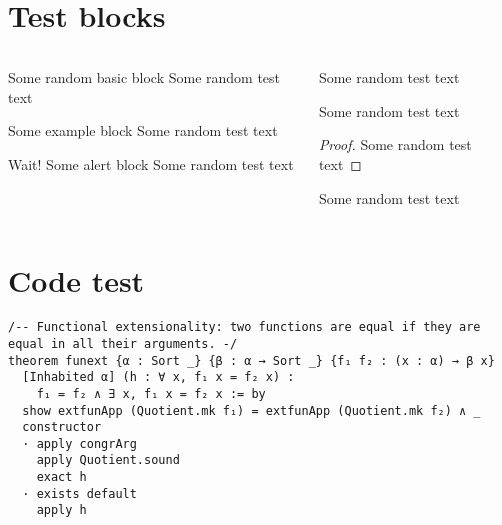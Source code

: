\documentclass[listings]{custom}
\begin{document}
\section{Test blocks}
\begin{sframe}
    \begin{columns}
        \begin{column}{.45\linewidth}
            \begin{block}{Some random basic block}
                Some random test text
            \end{block}
            \begin{exampleblock}{Some example block}
                Some random test text
            \end{exampleblock}
            \begin{alertblock}{Wait! Some alert block}
                Some random test text
            \end{alertblock}
        \end{column}
        \begin{column}{.45\linewidth}
            \begin{definition}
                Some random test text
            \end{definition}
            \begin{theorem}
                Some random test text
            \end{theorem}
            \begin{proof}
                Some random test text
            \end{proof}
            \begin{lemma}
                Some random test text
            \end{lemma}
        \end{column}
    \end{columns}
\end{sframe}

\section{Code test}
\begin{sframe}[fragile]
    \begin{lstlisting}[language=lean]
/-- Functional extensionality: two functions are equal if they are equal in all their arguments. -/
theorem funext {α : Sort _} {β : α → Sort _} {f₁ f₂ : (x : α) → β x}
  [Inhabited α] (h : ∀ x, f₁ x = f₂ x) : 
    f₁ = f₂ ∧ ∃ x, f₁ x = f₂ x := by
  show extfunApp (Quotient.mk f₁) = extfunApp (Quotient.mk f₂) ∧ _
  constructor 
  · apply congrArg
    apply Quotient.sound
    exact h
  · exists default
    apply h
\end{lstlisting}
\end{sframe}
\end{document}
